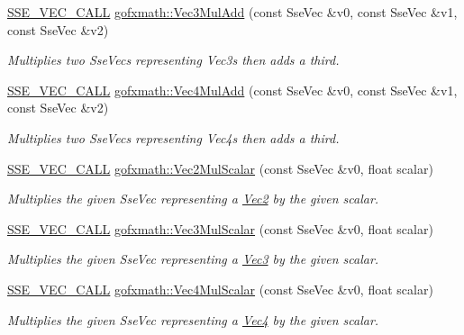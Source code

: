\begin{DoxyCompactItemize}
\hyperlink{ssevec__math__defs_8h_a97454f977a5281455cecacce1e8ba670}{S\+S\+E\+\_\+\+V\+E\+C\+\_\+\+C\+A\+L\+L} \hyperlink{group___s_i_m_d_vec_math_ga8bf86ce62253caf59a6312559c203272}{gofxmath\+::\+Vec3\+Mul\+Add} (const Sse\+Vec \&v0, const Sse\+Vec \&v1, const Sse\+Vec \&v2)
\begin{DoxyCompactList}\small\item\em Multiplies two Sse\+Vecs representing Vec3s then adds a third. \end{DoxyCompactList}\item 
\hyperlink{ssevec__math__defs_8h_a97454f977a5281455cecacce1e8ba670}{S\+S\+E\+\_\+\+V\+E\+C\+\_\+\+C\+A\+L\+L} \hyperlink{group___s_i_m_d_vec_math_gadd6b823e88b387ad8deaa65244ad46a0}{gofxmath\+::\+Vec4\+Mul\+Add} (const Sse\+Vec \&v0, const Sse\+Vec \&v1, const Sse\+Vec \&v2)
\begin{DoxyCompactList}\small\item\em Multiplies two Sse\+Vecs representing Vec4s then adds a third. \end{DoxyCompactList}\item 
\hyperlink{ssevec__math__defs_8h_a97454f977a5281455cecacce1e8ba670}{S\+S\+E\+\_\+\+V\+E\+C\+\_\+\+C\+A\+L\+L} \hyperlink{group___s_i_m_d_vec_math_ga3498fd49b8075dc7bea8512216819822}{gofxmath\+::\+Vec2\+Mul\+Scalar} (const Sse\+Vec \&v0, float scalar)
\begin{DoxyCompactList}\small\item\em Multiplies the given Sse\+Vec representing a \hyperlink{classgofxmath_1_1_vec2}{Vec2} by the given scalar. \end{DoxyCompactList}\item 
\hyperlink{ssevec__math__defs_8h_a97454f977a5281455cecacce1e8ba670}{S\+S\+E\+\_\+\+V\+E\+C\+\_\+\+C\+A\+L\+L} \hyperlink{group___s_i_m_d_vec_math_ga8629aabc4a7f360497641e3e9179dc4b}{gofxmath\+::\+Vec3\+Mul\+Scalar} (const Sse\+Vec \&v0, float scalar)
\begin{DoxyCompactList}\small\item\em Multiplies the given Sse\+Vec representing a \hyperlink{classgofxmath_1_1_vec3}{Vec3} by the given scalar. \end{DoxyCompactList}\item 
\hyperlink{ssevec__math__defs_8h_a97454f977a5281455cecacce1e8ba670}{S\+S\+E\+\_\+\+V\+E\+C\+\_\+\+C\+A\+L\+L} \hyperlink{group___s_i_m_d_vec_math_gac0c5fe54879497395203b4bf7e31586b}{gofxmath\+::\+Vec4\+Mul\+Scalar} (const Sse\+Vec \&v0, float scalar)
\begin{DoxyCompactList}\small\item\em Multiplies the given Sse\+Vec representing a \hyperlink{classgofxmath_1_1_vec4}{Vec4} by the given scalar. \end{DoxyCompactList}\item 

\end{DoxyCompactItemize}

